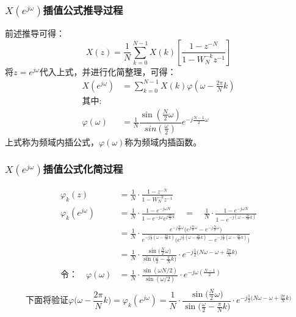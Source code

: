\documentclass[notheorems,compress,mathserif,table]{beamer}
\begin{document}
\begin{frame}[shrink]\frametitle{$ X(e^{j\omega}) $插值公式推导过程}
前述推导可得：
$$X(z) =  \frac{1}{N}\sum_{k=0}^{N-1}X(k)\left[\dfrac{1-z^{-N}}{1-W_N^{-k}z^{-1}} \right] $$
将$ z = e^{j\omega} $代入上式，并进行化简整理，可得：
\begin{equation*}
\begin{split}
X(e^{j\omega})  &= \sum_{k=0}^{N-1}X(k) \varphi\left(\omega - \frac{2\pi}{N}k \right) \\
\mbox{其中:}    & \quad  \\
\varphi(\omega) &= \frac{1}{N} \dfrac{\sin(\frac{N}{2}\omega )}{sin(\frac{\omega}{2})}e^{-j\frac{N-1}{2}\omega }  
\end{split}
\end{equation*}
上式称为频域内插公式，$ \varphi(\omega) $称为{\Large 频域内插函数}。
\end{frame}




\begin{frame}[shrink]\frametitle{$ X(e^{j\omega}) $插值公式化简过程}%
\begin{equation*}
\begin{split}
\varphi_k(z)   &= \frac{1}{N}\cdot\frac{1-z^{-N}}{1-W_N^{-k}z^{-1}} \\
\varphi_k(e^{j\omega})
      &= \frac{1}{N}\cdot\frac{1-e^{-j\omega N}}{1-e^{-j\omega}e^{j\frac{2\pi}{N}k}} \quad =\quad  \frac{1}{N}\cdot\frac{1-e^{-j\omega N}}{1-e^{-j(\omega-\frac{2\pi}{N}k)}}\\
      &= \frac{1}{N}\cdot\frac{e^{-j\frac{N}{2}\omega}\big(e^{j\frac{N}{2}\omega}-e^{-j\frac{N}{2}\omega}\big)}
                {e^{-j\frac{1}{2}(\omega- \frac{2\pi}{N}k)}\big( e^{j\frac{1}{2}(\omega- \frac{2\pi}{N}k)} -e^{-j\frac{1}{2}(\omega- \frac{2\pi}{N}k)}  \big)}\\
      &= \frac{1}{N}\cdot\frac{\sin\big(\frac{N}{2}\omega\big)}{\sin\Big(\frac{\omega}{2} -\frac{\pi}{N}k\Big)}\cdot e^{-j\frac{1}{2}\big(N\omega-\omega + \frac{2\pi}{N}k\big) }\\
 \mbox{令：} \quad  \varphi(\omega)
      &= \frac{1}{N}\cdot\frac{\sin(\omega N/2)}{\sin(\omega/2)}\cdot e^{-j\omega(\frac{N-1}{2}) }\\
\end{split}
\end{equation*}
$$\mbox{下面将验证}\varphi\Big(\omega-\frac{2\pi}{N}k\Big) =\varphi_k(e^{j\omega}) =\frac{1}{N}\cdot\frac{\sin\big(\frac{N}{2}\omega\big)}{\sin\Big(\frac{\omega}{2} -\frac{\pi}{N}k\Big)}\cdot e^{-j\frac{1}{2}\big(N\omega-\omega + \frac{2\pi}{N}k\big) } $$
\end{frame}
\end{document}
